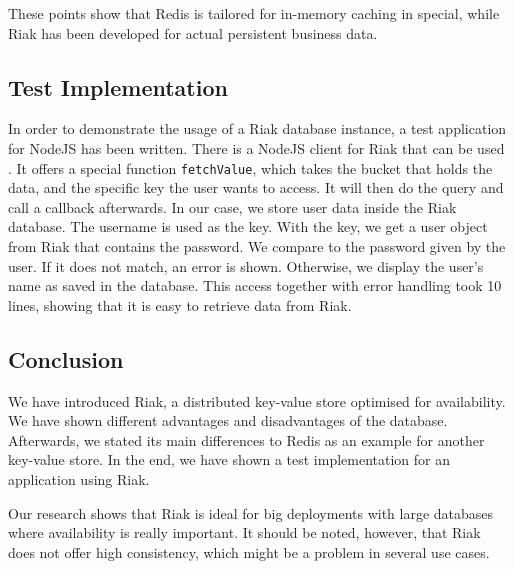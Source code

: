 These points show that Redis is tailored for in-memory caching in special, while Riak has been developed for actual persistent business data. 

\subsection{Test Implementation}
In order to demonstrate the usage of a Riak database instance, a test application for NodeJS has been written. There is a NodeJS client for Riak that can be used \parencite{RiakNodeJsClient}. It offers a special function \texttt{fetchValue}, which takes the bucket that holds the data, and the specific key the user wants to access. It will then do the query and call a callback afterwards. In our case, we store user data inside the Riak database. The username is used as the key. With the key, we get a user object from Riak that contains the password. We compare to the password given by the user. If it does not match, an error is shown. Otherwise, we display the user's name as saved in the database. This access together with error handling took 10 lines, showing that it is easy to retrieve data from Riak.

\subsection{Conclusion}
We have introduced Riak, a distributed key-value store optimised for availability. We have shown different advantages and disadvantages of the database. Afterwards, we stated its main differences to Redis as an example for another key-value store. In the end, we have shown a test implementation for an application using Riak.

Our research shows that Riak is ideal for big deployments with large databases where availability is really important. It should be noted, however, that Riak does not offer high consistency, which might be a problem in several use cases.
